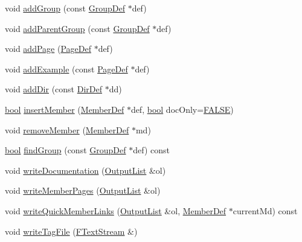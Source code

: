 \begin{DoxyCompactItemize}
\item 
void \hyperlink{class_group_def_a75f4bf0d8f41de50874ed9a633b1cf0f}{add\+Group} (const \hyperlink{class_group_def}{Group\+Def} $\ast$def)
\item 
void \hyperlink{class_group_def_a6ca14ecf9ec2395e9738b5eb45d01c1a}{add\+Parent\+Group} (const \hyperlink{class_group_def}{Group\+Def} $\ast$def)
\item 
void \hyperlink{class_group_def_aafcf9df1cd66bed1e66cbb05f4f3e694}{add\+Page} (\hyperlink{class_page_def}{Page\+Def} $\ast$def)
\item 
void \hyperlink{class_group_def_aa8a5e75c17e619f7944b67e1f8cb4bab}{add\+Example} (const \hyperlink{class_page_def}{Page\+Def} $\ast$def)
\item 
void \hyperlink{class_group_def_ad0b6731433cd2c276b7edca31f159aa9}{add\+Dir} (const \hyperlink{class_dir_def}{Dir\+Def} $\ast$dd)
\item 
\hyperlink{qglobal_8h_a1062901a7428fdd9c7f180f5e01ea056}{bool} \hyperlink{class_group_def_a88b12bc96a9c8c58ddfd8ee378d1af15}{insert\+Member} (\hyperlink{class_member_def}{Member\+Def} $\ast$def, \hyperlink{qglobal_8h_a1062901a7428fdd9c7f180f5e01ea056}{bool} doc\+Only=\hyperlink{qglobal_8h_a10e004b6916e78ff4ea8379be80b80cc}{F\+A\+L\+S\+E})
\item 
void \hyperlink{class_group_def_a05b7c4875a3ad7ee5789ac6cc5da4be9}{remove\+Member} (\hyperlink{class_member_def}{Member\+Def} $\ast$md)
\item 
\hyperlink{qglobal_8h_a1062901a7428fdd9c7f180f5e01ea056}{bool} \hyperlink{class_group_def_a41f66c7b60d0cab3b97b7fa28b570e69}{find\+Group} (const \hyperlink{class_group_def}{Group\+Def} $\ast$def) const 
\item 
void \hyperlink{class_group_def_aab9bf5ba484cedffb49ee38b2f69eb79}{write\+Documentation} (\hyperlink{class_output_list}{Output\+List} \&ol)
\item 
void \hyperlink{class_group_def_a38ce5bec40660b86d497f2fc13883f24}{write\+Member\+Pages} (\hyperlink{class_output_list}{Output\+List} \&ol)
\item 
void \hyperlink{class_group_def_a26dafd27926af1099d4630400688b20f}{write\+Quick\+Member\+Links} (\hyperlink{class_output_list}{Output\+List} \&ol, \hyperlink{class_member_def}{Member\+Def} $\ast$current\+Md) const 
\item 
void \hyperlink{class_group_def_af8ce245c3b6ba9fc5b8e575995205913}{write\+Tag\+File} (\hyperlink{class_f_text_stream}{F\+Text\+Stream} \&)
\item 

\end{DoxyCompactItemize}
